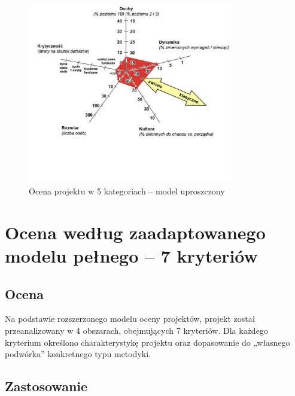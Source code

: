 \documentclass[12pt,a4paper,colorlinks=true,linkcolor=NavyBlue,citecolor=red,urlcolor=NavyBlue]{book}
\begin{document}
\begin{figure}[H]
  \centering
  \includegraphics[width=0.8\textwidth]{ocena_modelu.jpeg}
  \caption{Ocena projektu w 5 kategoriach – model uproszczony}
\end{figure}


\newpage
\thispagestyle{empty}
\null
\newpage


\newpage
\thispagestyle{empty}
\null
\newpage


\chapter{Ocena według zaadaptowanego modelu pełnego – 7 kryteriów}

\section{Ocena}

Na podstawie rozszerzonego modelu oceny projektów, projekt został przeanalizowany w 4 obszarach, obejmujących 7 kryteriów. Dla każdego kryterium określono charakterystykę projektu oraz dopasowanie do „własnego podwórka” konkretnego typu metodyki.

\section{Zastosowanie}
\end{document}
